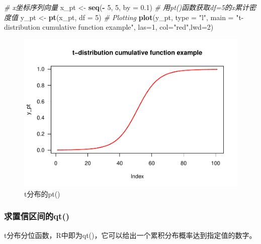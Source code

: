 \documentclass[
]{article}
\newenvironment{Shaded}{\begin{snugshade}}{\end{snugshade}}
\newcommand{\CommentTok}[1]{\textcolor[rgb]{0.56,0.35,0.01}{\textit{#1}}}
\newcommand{\DataTypeTok}[1]{\textcolor[rgb]{0.13,0.29,0.53}{#1}}
\newcommand{\DecValTok}[1]{\textcolor[rgb]{0.00,0.00,0.81}{#1}}
\newcommand{\FloatTok}[1]{\textcolor[rgb]{0.00,0.00,0.81}{#1}}
\newcommand{\KeywordTok}[1]{\textcolor[rgb]{0.13,0.29,0.53}{\textbf{#1}}}
\newcommand{\NormalTok}[1]{#1}
\newcommand{\OperatorTok}[1]{\textcolor[rgb]{0.81,0.36,0.00}{\textbf{#1}}}
\newcommand{\StringTok}[1]{\textcolor[rgb]{0.31,0.60,0.02}{#1}}
\begin{document}
\begin{Shaded}
\begin{Highlighting}[]
\CommentTok{# x坐标序列向量}
\NormalTok{x_pt <-}\StringTok{ }\KeywordTok{seq}\NormalTok{(}\OperatorTok{-}\StringTok{ }\DecValTok{5}\NormalTok{, }\DecValTok{5}\NormalTok{, }\DataTypeTok{by =} \FloatTok{0.1}\NormalTok{)}
\CommentTok{# 用pt()函数获取df=5的x累计密度值}
\NormalTok{y_pt <-}\StringTok{ }\KeywordTok{pt}\NormalTok{(x_pt, }\DataTypeTok{df =} \DecValTok{5}\NormalTok{)}
\CommentTok{# Plotting }
\KeywordTok{plot}\NormalTok{(y_pt, }\DataTypeTok{type =} \StringTok{"l"}\NormalTok{, }\DataTypeTok{main =} \StringTok{"t-distribution cumulative function example"}\NormalTok{, }\DataTypeTok{las=}\DecValTok{1}\NormalTok{, }\DataTypeTok{col=}\StringTok{"red"}\NormalTok{,}\DataTypeTok{lwd=}\DecValTok{2}\NormalTok{)}
\end{Highlighting}
\end{Shaded}

\begin{figure}

{\centering \includegraphics[width=0.49\linewidth,height=0.49\textheight]{figs/pttest} 

}

\caption{t分布的pt()}\label{fig:pttest}
\end{figure}

\hypertarget{ux6c42ux7f6eux4fe1ux533aux95f4ux7684qt}{%
\subsubsection{求置信区间的qt()}\label{ux6c42ux7f6eux4fe1ux533aux95f4ux7684qt}}

t分布分位函数，R中即为qt()，它可以给出一个累积分布概率达到指定值的数字。

\begin{Shaded}
\end{Shaded}
\end{document}

